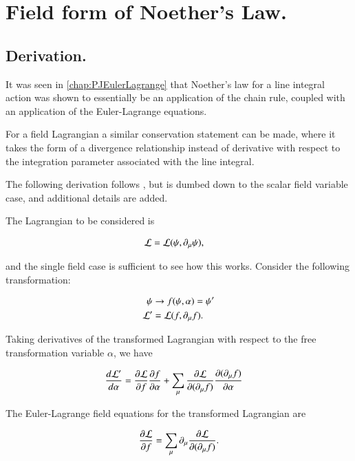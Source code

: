 \chapter{Field form of Noether's Law.}\label{chap:PJNoethersField}
\date{ October 29, 2008.  Last Revision: $Date: 2009/06/06 23:38:27 $ }

\section{Derivation. }

It was seen in 
\ref{chap:PJEulerLagrange} 
that Noether's law for a line integral action was shown
to essentially be an application of the chain rule, coupled with
an application of the Euler-Lagrange equations.

For a field Lagrangian a similar conservation statement can be made, where
it takes the form of a divergence relationship instead of derivative
with respect to the integration parameter associated with the line integral.

The following derivation follows \cite{doran2003gap}, but is dumbed down to the scalar field variable case, and
additional details are added.

The Lagrangian to be considered is

\begin{align*}
\mathcal{L} &= \mathcal{L}(\psi, \partial_\mu \psi),
\end{align*}

and the single field case is sufficient to see how this works.  Consider the following transformation:

\begin{align*}
\psi &\rightarrow f(\psi, \alpha) = \psi' \\
\mathcal{L}' &= \mathcal{L}(f, \partial_\mu f).
\end{align*}

Taking derivatives of the transformed Lagrangian with respect to the free transformation variable $\alpha$, we have

\begin{align}\label{eqn:noetherField:noetherschain}
\frac{d\mathcal{L}'}{d\alpha}
&= \frac{\partial {\mathcal{L}}}{\partial {f}}\frac{\partial {f}}{\partial {\alpha}} + \sum_\mu \frac{\partial {\mathcal{L}}}{\partial {(\partial_\mu f)}}\frac{\partial {(\partial_\mu f)}}{\partial {\alpha}}
\end{align}

The Euler-Lagrange field equations for the transformed Lagrangian are

\begin{align}\label{eqn:noetherField:eulerLag}
\frac{\partial {\mathcal{L}}}{\partial {f}} = \sum_\mu \partial_\mu \frac{\partial {\mathcal{L}}}{\partial {(\partial_\mu f)}}.
\end{align}

